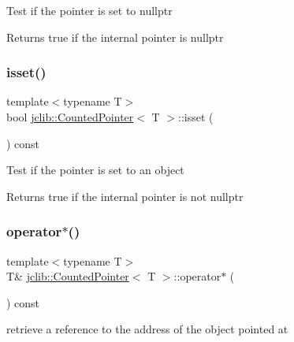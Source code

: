 Test if the pointer is set to nullptr \begin{DoxyReturn}{Returns}
true if the internal pointer is nullptr 
\end{DoxyReturn}
\mbox{\label{classjclib_1_1CountedPointer_aba4799319512576d8873edd9239d7073}} 
\subsubsection{\texorpdfstring{isset()}{isset()}}
{\footnotesize\ttfamily template$<$typename T$>$ \\
bool \hyperlink{classjclib_1_1CountedPointer}{jclib\+::\+Counted\+Pointer}$<$ T $>$\+::isset (\begin{DoxyParamCaption}{ }\end{DoxyParamCaption}) const\hspace{0.3cm}{\ttfamily [inline]}}

Test if the pointer is set to an object \begin{DoxyReturn}{Returns}
true if the internal pointer is not nullptr 
\end{DoxyReturn}
\mbox{\label{classjclib_1_1CountedPointer_a99a1a5e8632a82f9a29ab821afef56c0}} 
\subsubsection{\texorpdfstring{operator$\ast$()}{operator*()}}
{\footnotesize\ttfamily template$<$typename T$>$ \\
T\& \hyperlink{classjclib_1_1CountedPointer}{jclib\+::\+Counted\+Pointer}$<$ T $>$\+::operator$\ast$ (\begin{DoxyParamCaption}{ }\end{DoxyParamCaption}) const\hspace{0.3cm}{\ttfamily [inline]}}

retrieve a reference to the address of the object pointed at \mbox{\label{classjclib_1_1CountedPointer_afb6cd270bc839dd042d9762c92cc1fc5}} 
